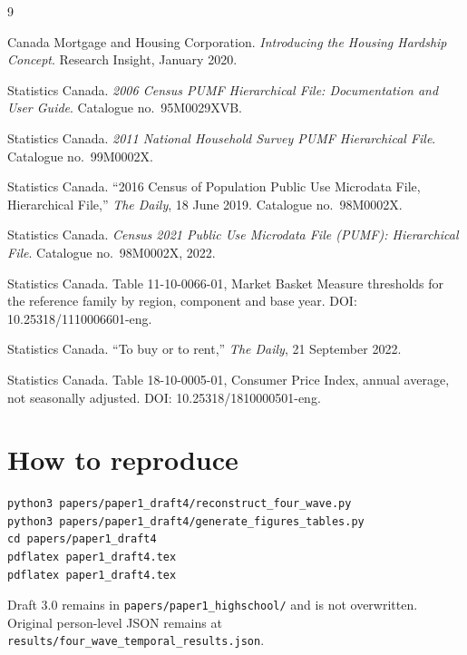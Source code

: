 \documentclass[11pt,letterpaper]{article}
\begin{document}
\begin{thebibliography}{9}

Canada Mortgage and Housing Corporation.
\newblock \emph{Introducing the Housing Hardship Concept}.
\newblock Research Insight, January 2020.

Statistics Canada.
\newblock \emph{2006 Census PUMF Hierarchical File: Documentation and User Guide}.
\newblock Catalogue no.~95M0029XVB.

Statistics Canada.
\newblock \emph{2011 National Household Survey PUMF Hierarchical File}.
\newblock Catalogue no.~99M0002X.

Statistics Canada.
\newblock ``2016 Census of Population Public Use Microdata File, Hierarchical File,'' \emph{The Daily}, 18 June 2019.
\newblock Catalogue no.~98M0002X.

Statistics Canada.
\newblock \emph{Census 2021 Public Use Microdata File (PUMF): Hierarchical File}.
\newblock Catalogue no.~98M0002X, 2022.

Statistics Canada.
\newblock Table 11-10-0066-01, Market Basket Measure thresholds for the reference family by region, component and base year.
\newblock DOI: 10.25318/1110006601-eng.

Statistics Canada.
\newblock ``To buy or to rent,'' \emph{The Daily}, 21 September 2022.

Statistics Canada.
\newblock Table 18-10-0005-01, Consumer Price Index, annual average, not seasonally adjusted.
\newblock DOI: 10.25318/1810000501-eng.

\end{thebibliography}

\appendix
\section{How to reproduce}
\label{app:repro}

\begin{verbatim}
python3 papers/paper1_draft4/reconstruct_four_wave.py
python3 papers/paper1_draft4/generate_figures_tables.py
cd papers/paper1_draft4
pdflatex paper1_draft4.tex
pdflatex paper1_draft4.tex
\end{verbatim}

Draft 3.0 remains in \texttt{papers/paper1\_highschool/} and is not overwritten.
Original person-level JSON remains at \texttt{results/four\_wave\_temporal\_results.json}.
\end{document}
